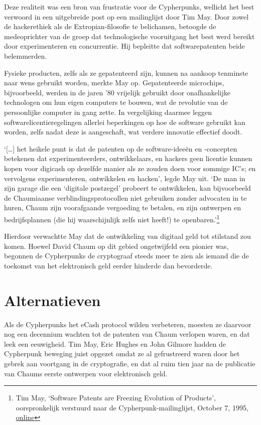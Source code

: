 \documentclass[
  a5paper,
  smalldemyvopaper,11pt,twoside,onecolumn,openright,extrafontsizes,
hidelinks]{memoir}
\begin{document}
Deze realiteit was een bron van frustratie voor de Cypherpunks, wellicht
het best verwoord in een uitgebreide post op een mailinglijst door Tim
May. Door zowel de hackerethiek als de Extropian-filosofie te
belichamen, betoogde de medeoprichter van de groep dat technologische
vooruitgang het best werd bereikt door experimenteren en concurrentie.
Hij bepleitte dat softwarepatenten beide belemmerden.

Fysieke producten, zelfs als ze gepatenteerd zijn, kunnen na aankoop
tenminste naar wens gebruikt worden, merkte May op. Gepatenteerde
microchips, bijvoorbeeld, werden in de jaren '80 vrijelijk gebruikt door
onafhankelijke technologen om hun eigen computers te bouwen, wat de
revolutie van de persoonlijke computer in gang zette. In vergelijking
daarmee leggen softwarelicentieregelingen allerlei beperkingen op hoe de
software gebruikt kan worden, zelfs nadat deze is aangeschaft, wat
verdere innovatie effectief doodt.

`{[}\ldots{]} het heikele punt is dat de patenten op de software-ideeën
en -concepten betekenen dat experimenteerders, ontwikkelaars, en hackers
geen licentie kunnen kopen voor digicash op dezelfde manier als ze
zouden doen voor sommige IC's; en vervolgens experimenteren, ontwikkelen
en hacken', legde May uit. `De man in zijn garage die een `digitale
postzegel' probeert te ontwikkelen, kan bijvoorbeeld de Chaumiaanse
verblindingsprotocollen niet gebruiken zonder advocaten in te huren,
Chaum zijn voorafgaande vergoeding te betalen, en zijn ontwerpen en
bedrijfsplannen (die hij waarschijnlijk zelfs niet heeft!) te
openbaren.'\footnote{Tim May, `Software Patents are Freezing Evolution
  of Products', oorspronkelijk verstuurd naar de
  Cypherpunk-mailinglijst, October 7, 1995,
  \href{https://cypherpunks.venona.com/date/1995/10/msg00685.html}{online}}

Hierdoor verwachtte May dat de ontwikkeling van digitaal geld tot
stilstand zou komen. Hoewel David Chaum op dit gebied ongetwijfeld een
pionier was, begonnen de Cypherpunks de cryptograaf steeds meer te zien
als iemand die de toekomst van het elektronisch geld eerder hinderde dan
bevorderde.

\section{Alternatieven}\label{alternatieven}

Als de Cypherpunks het eCash protocol wilden verbeteren, moesten ze
daarvoor nog een decennium wachten tot de patenten van Chaum verlopen
waren, en dat leek een eeuwigheid. Tim May, Eric Hughes en John Gilmore
hadden de Cypherpunk beweging juist opgezet omdat ze al gefrustreerd
waren door het gebrek aan voortgang in de cryptografie, en dat al ruim
tien jaar na de publicatie van Chaums eerste ontwerpen voor elektronisch
geld.
\end{document}
